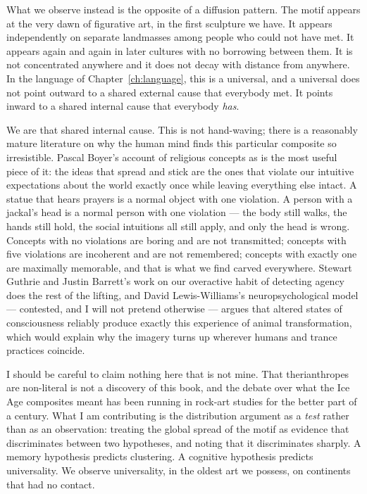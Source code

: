 What we observe instead is the opposite of a diffusion pattern. The motif appears at the very dawn
of figurative art, in the first sculpture we have. It appears independently on separate landmasses
among people who could not have met. It appears again and again in later cultures with no
borrowing between them. It is not concentrated anywhere and it does not decay with distance from
anywhere. In the language of Chapter~\ref{ch:language}, this is a universal, and a universal does
not point outward to a shared external cause that everybody met. It points inward to a shared
internal cause that everybody \emph{has}.

We are that shared internal cause. This is not hand-waving; there is a reasonably mature literature
on why the human mind finds this particular composite so irresistible. Pascal Boyer's account of
religious concepts as  is the most useful piece of it: the ideas
that spread and stick are the ones that violate our intuitive expectations about the world exactly
once while leaving everything else intact. A statue that hears prayers is a normal object with one
violation. A person with a jackal's head is a normal person with one violation --- the body still
walks, the hands still hold, the social intuitions all still apply, and only the head is wrong.
Concepts with no violations are boring and are not transmitted; concepts with five violations are
incoherent and are not remembered; concepts with exactly one are maximally memorable, and that is
what we find carved everywhere. Stewart Guthrie and Justin Barrett's work on our overactive habit
of detecting agency does the rest of the lifting, and David Lewis-Williams's neuropsychological
model --- contested, and I will not pretend otherwise --- argues that altered states of
consciousness reliably produce exactly this experience of animal transformation, which would
explain why the imagery turns up wherever humans and trance practices coincide.

I should be careful to claim nothing here that is not mine. That therianthropes are non-literal is
not a discovery of this book, and the debate over what the Ice Age composites meant has been
running in rock-art studies for the better part of a century. What I am contributing is the
distribution argument as a \emph{test} rather than as an observation: treating the global spread of
the motif as evidence that discriminates between two hypotheses, and noting that it discriminates
sharply. A memory hypothesis predicts clustering. A cognitive hypothesis predicts universality. We
observe universality, in the oldest art we possess, on continents that had no contact.

